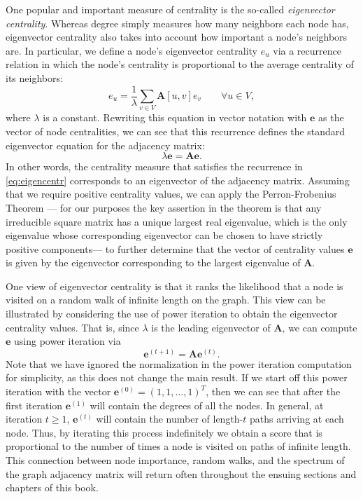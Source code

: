 \documentclass[10pt]{book}
\let\defaultmarginpar\marginpar
\renewcommand\marginpar[2][]{\defaultmarginpar{\itshape\color{gray}#2}}
\begin{document}
One popular and important measure of centrality is the so-called \emph{eigenvector centrality}\marginpar{eigenvector centrality}. Whereas degree simply measures how many neighbors each node has, eigenvector centrality also takes into account how important a node's neighbors are. In particular, we define a node's eigenvector centrality $e_u$ via a recurrence relation in which the node's centrality is proportional to the average centrality of its neighbors:
\begin{equation}
    e_u = \frac1\lambda \sum_{v \in V} \mathbf A[u, v] e_v \qquad \forall u \in V,
    \label{eq:eigencentr}
\end{equation}
where $\lambda$ is a constant. Rewriting this equation in vector notation with $\mathbf e$ as the vector of node centralities, we can see that this recurrence defines the standard eigenvector equation for the adjacency matrix:
\begin{equation}
    \lambda \mathbf e = \mathbf A \mathbf e.
\end{equation}
In other words, the centrality measure that satisfies the recurrence in \autoref{eq:eigencentr} corresponds to an eigenvector of the adjacency matrix. Assuming that we require positive centrality values, we can apply the Perron-Frobenius Theorem --- for our purposes the key assertion in the theorem is that any irreducible square matrix has a unique largest real eigenvalue, which is the only eigenvalue whose corresponding eigenvector can be chosen to have strictly positive components---  to further determine that the vector of centrality values $\mathbf e$ is given by the eigenvector corresponding to the largest eigenvalue of $\mathbf A$.

One view of eigenvector centrality is that it ranks the likelihood that a node is visited on a random walk of infinite length on the graph. This view can be illustrated by considering the use of power iteration to obtain the eigenvector centrality values. That is, since $\lambda$ is the leading eigenvector of $\mathbf A$, we can compute $\mathbf e$ using power iteration via
\begin{equation}
    \mathbf e^{(t+1)} = \mathbf A \mathbf e^{(t)}.
\end{equation}
Note that we have ignored the normalization in the power iteration computation for simplicity, as this does not change the main result. If we start off this power iteration with the vector $\mathbf e^{(0)} = (1, 1, \ldots, 1)^T$, then we can see that after the first iteration $\mathbf e^{(1)}$ will contain the degrees of all the nodes. In general, at iteration $t \ge 1$, $\mathbf e^{(t)}$ will contain the number of length-$t$ paths arriving at each node. Thus, by iterating this process indefinitely we obtain a score that is proportional to the number of times a node is visited on paths of infinite length. This connection between node importance, random walks, and the spectrum of the graph adjacency matrix will return often throughout the ensuing sections and chapters of this book.
\smallskip
\end{document}
